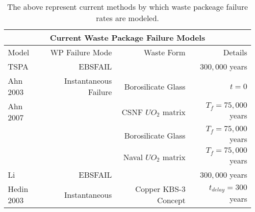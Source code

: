 \begin{table}[h!]
\centering
\footnotesize{
\begin{tabular}[h!bt]{|l|r|r|r|}
  \multicolumn{4}{c}{\textbf{Current Waste Package Failure Models}}\\
  \hline
  Model&WP Failure Mode&Waste Form&Details\\
  \hline
  TSPA&EBSFAIL&&$300,000$ years\\
  \hline
  Ahn 2003&Instantaneous Failure&Borosilicate Glass&$t=0$\\
  \hline
  Ahn 2007& &CSNF $UO_2$ matrix &$T_f=75,000$ years\\
  & &Borosilicate Glass &$T_f=75,000$ years\\
  & & Naval $UO_2$ matrix &$T_f=75,000$ years\\
  \hline
  Li&EBSFAIL&&$300,000$ years\\
  \hline
  Hedin 2003& Instantaneous & Copper KBS-3 Concept & $t_{delay} = 300$ years \\
  \hline
\end{tabular}
\label{tab:wpfail}
\caption[Current WP Failure Models]{The above represent current methods by which waste packeage 
failure rates are modeled.}
}
\end{table}
